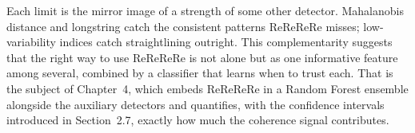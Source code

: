 \documentclass[doc,11pt,donotrepeattitle]{apa7}
\begin{document}
Each limit is the mirror image of a strength of some other detector. Mahalanobis
distance and longstring catch the consistent patterns ReReReRe misses;
low-variability indices catch straightlining outright. This complementarity
suggests that the right way to use ReReReRe is not alone but as one informative
feature among several, combined by a classifier that learns when to trust each.
That is the subject of Chapter~4, which embeds ReReReRe in a Random Forest
ensemble alongside the auxiliary detectors and quantifies, with the confidence
intervals introduced in Section~2.7, exactly how much the coherence signal
contributes.

\printbibliography
\end{document}
